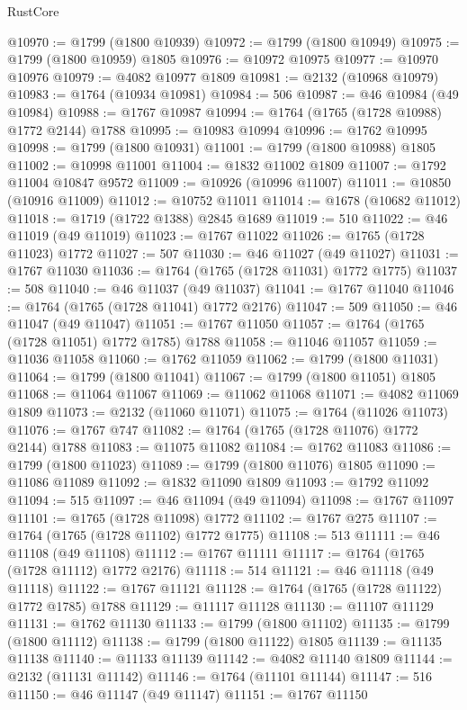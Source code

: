 \begin{lexlean}{RustCore}
\begin{coremodule}
@10970 := @1799 (@1800 @10939)
@10972 := @1799 (@1800 @10949)
@10975 := @1799 (@1800 @10959) @1805
@10976 := @10972 @10975
@10977 := @10970 @10976
@10979 := @4082 @10977 @1809
@10981 := @2132 (@10968 @10979)
@10983 := @1764 (@10934 @10981)
@10984 := 506
@10987 := @46 @10984 (@49 @10984)
@10988 := @1767 @10987
@10994 := @1764 (@1765 (@1728 @10988) @1772 @2144) @1788
@10995 := @10983 @10994
@10996 := @1762 @10995
@10998 := @1799 (@1800 @10931)
@11001 := @1799 (@1800 @10988) @1805
@11002 := @10998 @11001
@11004 := @1832 @11002 @1809
@11007 := @1792 @11004 @10847 @9572
@11009 := @10926 (@10996 @11007)
@11011 := @10850 (@10916 @11009)
@11012 := @10752 @11011
@11014 := @1678 (@10682 @11012)
@11018 := @1719 (@1722 @1388) @2845 @1689
@11019 := 510
@11022 := @46 @11019 (@49 @11019)
@11023 := @1767 @11022
@11026 := @1765 (@1728 @11023) @1772
@11027 := 507
@11030 := @46 @11027 (@49 @11027)
@11031 := @1767 @11030
@11036 := @1764 (@1765 (@1728 @11031) @1772 @1775)
@11037 := 508
@11040 := @46 @11037 (@49 @11037)
@11041 := @1767 @11040
@11046 := @1764 (@1765 (@1728 @11041) @1772 @2176)
@11047 := 509
@11050 := @46 @11047 (@49 @11047)
@11051 := @1767 @11050
@11057 := @1764 (@1765 (@1728 @11051) @1772 @1785) @1788
@11058 := @11046 @11057
@11059 := @11036 @11058
@11060 := @1762 @11059
@11062 := @1799 (@1800 @11031)
@11064 := @1799 (@1800 @11041)
@11067 := @1799 (@1800 @11051) @1805
@11068 := @11064 @11067
@11069 := @11062 @11068
@11071 := @4082 @11069 @1809
@11073 := @2132 (@11060 @11071)
@11075 := @1764 (@11026 @11073)
@11076 := @1767 @747
@11082 := @1764 (@1765 (@1728 @11076) @1772 @2144) @1788
@11083 := @11075 @11082
@11084 := @1762 @11083
@11086 := @1799 (@1800 @11023)
@11089 := @1799 (@1800 @11076) @1805
@11090 := @11086 @11089
@11092 := @1832 @11090 @1809
@11093 := @1792 @11092
@11094 := 515
@11097 := @46 @11094 (@49 @11094)
@11098 := @1767 @11097
@11101 := @1765 (@1728 @11098) @1772
@11102 := @1767 @275
@11107 := @1764 (@1765 (@1728 @11102) @1772 @1775)
@11108 := 513
@11111 := @46 @11108 (@49 @11108)
@11112 := @1767 @11111
@11117 := @1764 (@1765 (@1728 @11112) @1772 @2176)
@11118 := 514
@11121 := @46 @11118 (@49 @11118)
@11122 := @1767 @11121
@11128 := @1764 (@1765 (@1728 @11122) @1772 @1785) @1788
@11129 := @11117 @11128
@11130 := @11107 @11129
@11131 := @1762 @11130
@11133 := @1799 (@1800 @11102)
@11135 := @1799 (@1800 @11112)
@11138 := @1799 (@1800 @11122) @1805
@11139 := @11135 @11138
@11140 := @11133 @11139
@11142 := @4082 @11140 @1809
@11144 := @2132 (@11131 @11142)
@11146 := @1764 (@11101 @11144)
@11147 := 516
@11150 := @46 @11147 (@49 @11147)
@11151 := @1767 @11150

\end{coremodule}
\end{lexlean}
